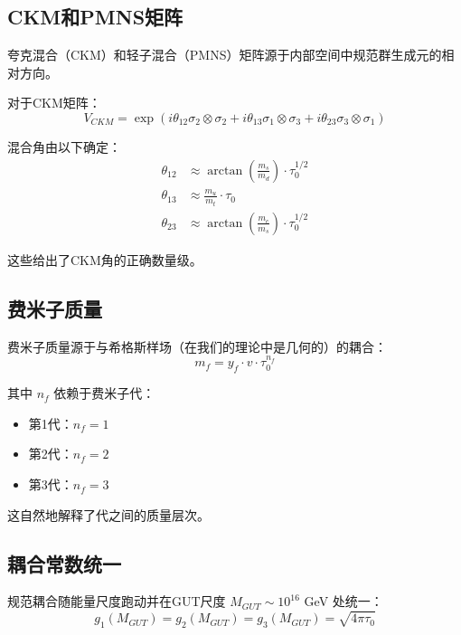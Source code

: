 \subsection{CKM和PMNS矩阵}

夸克混合（CKM）和轻子混合（PMNS）矩阵源于内部空间中规范群生成元的相对方向。

对于CKM矩阵：
\begin{equation}
    V_{CKM} = \exp\left(i \theta_{12} \sigma_2 \otimes \sigma_2 + i \theta_{13} \sigma_1 \otimes \sigma_3 + i \theta_{23} \sigma_3 \otimes \sigma_1\right)
\end{equation}

混合角由以下确定：
\begin{align}
    \theta_{12} &\approx \arctan\left(\frac{m_s}{m_d}\right) \cdot \tau_0^{1/2} \\
    \theta_{13} &\approx \frac{m_u}{m_t} \cdot \tau_0 \\
    \theta_{23} &\approx \arctan\left(\frac{m_c}{m_s}\right) \cdot \tau_0^{1/2}
\end{align}

这些给出了CKM角的正确数量级。

\subsection{费米子质量}

费米子质量源于与希格斯样场（在我们的理论中是几何的）的耦合：
\begin{equation}
    m_f = y_f \cdot v \cdot \tau_0^{n_f}
\end{equation}

其中 $n_f$ 依赖于费米子代：
\begin{itemize}
    \item 第1代：$n_f = 1$
    \item 第2代：$n_f = 2$  
    \item 第3代：$n_f = 3$
\end{itemize}

这自然地解释了代之间的质量层次。

\subsection{耦合常数统一}

规范耦合随能量尺度跑动并在GUT尺度 $M_{GUT} \sim 10^{16}$ GeV 处统一：
\begin{equation}
    g_1(M_{GUT}) = g_2(M_{GUT}) = g_3(M_{GUT}) = \sqrt{4\pi\tau_0}
\end{equation}

